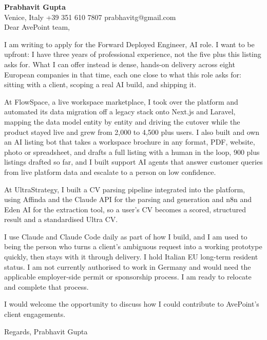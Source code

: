 \documentclass[a4paper,10.5pt]{article}
\begin{document}
\textbf{Prabhavit Gupta}\\
Venice, Italy \textbar{} +39 351 610 7807 \textbar{} prabhavitg@gmail.com\\[10pt]
Dear AvePoint team,

I am writing to apply for the Forward Deployed Engineer, AI role. I want to be upfront: I have three years of professional experience, not the five plus this listing asks for. What I can offer instead is dense, hands-on delivery across eight European companies in that time, each one close to what this role asks for: sitting with a client, scoping a real AI build, and shipping it.

At FlowSpace, a live workspace marketplace, I took over the platform and automated its data migration off a legacy stack onto Next.js and Laravel, mapping the data model entity by entity and driving the cutover while the product stayed live and grew from 2,000 to 4,500 plus users. I also built and own an AI listing bot that takes a workspace brochure in any format, PDF, website, photo or spreadsheet, and drafts a full listing with a human in the loop, 900 plus listings drafted so far, and I built support AI agents that answer customer queries from live platform data and escalate to a person on low confidence.

At UltraStrategy, I built a CV parsing pipeline integrated into the platform, using Affinda and the Claude API for the parsing and generation and n8n and Eden AI for the extraction tool, so a user's CV becomes a scored, structured result and a standardised Ultra CV.

I use Claude and Claude Code daily as part of how I build, and I am used to being the person who turns a client's ambiguous request into a working prototype quickly, then stays with it through delivery. I hold Italian EU long-term resident status. I am not currently authorised to work in Germany and would need the applicable employer-side permit or sponsorship process. I am ready to relocate and complete that process.

I would welcome the opportunity to discuss how I could contribute to AvePoint's client engagements.

Regards,
Prabhavit Gupta
\end{document}
